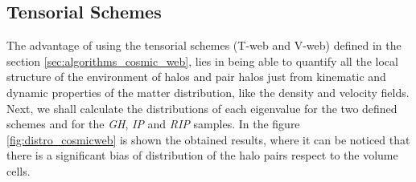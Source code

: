 \documentclass[usenatbib]{latex/mn2e}
\begin{document}
\subsection{Tensorial Schemes}
\label{subsec:tensorial schemes}



The advantage of using the tensorial schemes (T-web and V-web) defined in
the section \ref{sec:algorithms_cosmic_web}, lies in being able to quantify
all the local structure of the environment of halos and pair halos just 
from kinematic and dynamic properties of the matter distribution, like the
density and velocity fields. Next, we shall calculate the distributions of 
each eigenvalue for the two defined schemes and for the \textit{GH}, 
\textit{IP} and \textit{RIP} samples. In the figure 
\ref{fig:distro_cosmicweb} is shown the obtained results, where it can be 
noticed that there is a significant bias of distribution of the halo pairs 
respect to the volume cells.
\end{document}
